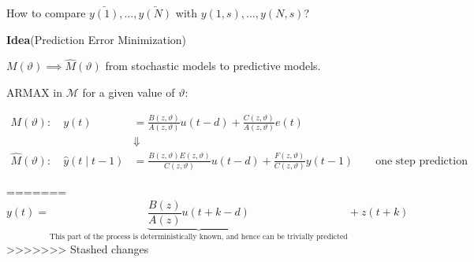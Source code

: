 
How to compare $\bar{y(1)},\ldots,\bar{y(N)}$ with $y(1,s),\ldots,y(N,s)$?


\textbf{Idea}(Prediction Error Minimization)

$M(\vartheta)\implies \hat{M}(\vartheta)$ from stochastic models to predictive models.

ARMAX in $\mathcal{M}$ for a given value of $\vartheta$:

\begin{align*}
	M(\vartheta):\quad y(t)&=\frac{B(z, \vartheta)}{A(z, \vartheta)} u(t-d)+\frac{C(z, \vartheta)}{A(z, \vartheta)} e(t)\\
	&\Downarrow\\
	\hat{M}(\vartheta): \quad \hat{y}(t \mid t-1) &=\frac{B(z,\vartheta) E(z,\vartheta)}{C(z,\vartheta)} u(t-d)+\frac{F(z,\vartheta)}{C(z,\vartheta)} y(t-1) \qquad \text{one step prediction}
\end{align*}



=======
$$y(t)=\underbrace{\frac{B(z)}{A(z)} u(t+k-d)}_{\text{This part of the process 
		is deterministically 
		known, and hence can 
		be trivially predicted}} +z(t+k)$$
>>>>>>> Stashed changes
